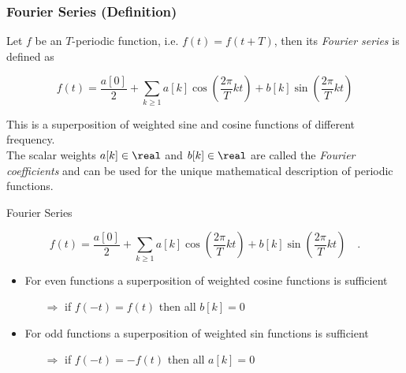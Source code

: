 \begin{frame}
    \frametitle{Fourier Series (Definition)}

    \begin{myDefinition}
        Let $f$ be an $T$-periodic function, i.e. $f(t) = f\left(t + T\right)$, then its \textit{Fourier series} is defined as
        \begin{center}
            \[f(t) = \dfrac {a[0]}{2} + \sum\limits_{k\ge1} a[k] \cos\left(\frac{2\pi}{T} k t\right) + b[k] \sin\left(\frac{2\pi}{T}kt\right)\]
        \end{center}
        \bigskip
        This is a superposition of weighted sine and cosine functions of different frequency. \\
        The scalar weights $a[k] \in \real$ and $b[k] \in \real$ are called the \textit{Fourier coefficients} and can be used for the unique mathematical description of periodic functions.
    \end{myDefinition}
\end{frame}



\begin{frame}[t]{Fourier Series}

    \begin{center}
        \[f(t) = \dfrac {a[0]}{2} + \sum\limits_{k\ge1} a[k] \cos\left(\frac{2\pi}{T}kt\right) + b[k] \sin\left(\frac{2\pi}{T}kt\right)\quad.\]
    \end{center}

    \begin{itemize}
        \setlength\itemsep{1.5em}
        \item For even functions a superposition of weighted cosine functions is sufficient
              \vspace{0.1cm}
              \begin{itemize}
                  \item [$\Rightarrow$] if $f(-t)=f(t)$ then all $b[k]=0$
              \end{itemize}

        \item For odd functions a superposition of weighted sin functions is sufficient

              \vspace{0.1cm}
              \begin{itemize}
                  \item[$\Rightarrow$] if $f(-t)=-f(t)$ then all $a[k]=0$
              \end{itemize}

    \end{itemize}

\end{frame}



